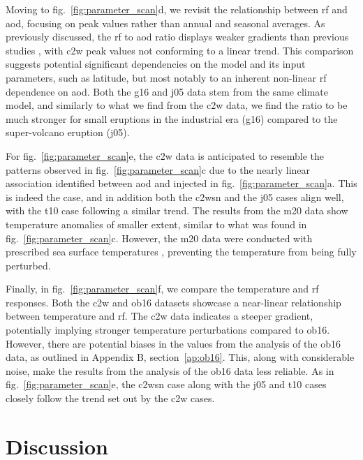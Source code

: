 \documentclass{ametsocV6.1}
\newcommand{\iso}[1][i]{{#1}njected \ce{SO2}}
\begin{document}
Moving to fig.~\ref{fig:parameter_scan}d, we revisit the relationship between \gls{rf}
and \gls{aod}, focusing on peak values rather than annual and seasonal averages. As
previously discussed, the \gls{rf} to \gls{aod} ratio displays weaker gradients than
previous studies \citep{jones2005, marshall2020, timmreck2010}, with \gls{c2w} peak
values not conforming to a linear trend. This comparison suggests potential significant
dependencies on the model and its input parameters, such as latitude, but most notably
to an inherent non-linear \gls{rf} dependence on \gls{aod}. Both the \gls{g16} and
\gls{j05} data stem from the same climate model, and similarly to what we find from the
\gls{c2w} data, we find the ratio to be much stronger for small eruptions in the
industrial era (\gls{g16}) compared to the super-volcano eruption (\gls{j05}).

For fig.~\ref{fig:parameter_scan}e, the \gls{c2w} data is anticipated to resemble the
patterns observed in fig.~\ref{fig:parameter_scan}c due to the nearly linear association
identified between \gls{aod} and \iso{} in fig.~\ref{fig:parameter_scan}a. This is
indeed the case, and in addition both the \gls{c2wsn} and the \gls{j05} cases align
well, with the \gls{t10} case following a similar trend. The results from the \gls{m20}
data show temperature anomalies of smaller extent, similar to what was found in
fig.~\ref{fig:parameter_scan}c. However, the \gls{m20} data were conducted with
prescribed sea surface temperatures \citep{marshall2020}, preventing the temperature
from being fully perturbed.

Finally, in fig.~\ref{fig:parameter_scan}f, we compare the temperature and \gls{rf}
responses. Both the \gls{c2w} and \gls{ob16} datasets showcase a near-linear
relationship between temperature and \gls{rf}. The \gls{c2w} data indicates a steeper
gradient, potentially implying stronger temperature perturbations compared to
\gls{ob16}. However, there are potential biases in the values from the analysis of the
\gls{ob16} data, as outlined in Appendix B, section~\ref{ap:ob16}. This, along with
considerable noise, make the results from the analysis of the \gls{ob16} data less
reliable. As in fig.~\ref{fig:parameter_scan}e, the \gls{c2wsn} case along with the
\gls{j05} and \gls{t10} cases closely follow the trend set out by the \gls{c2w} cases.

\section{Discussion}\label{sec:discussion}
\end{document}
